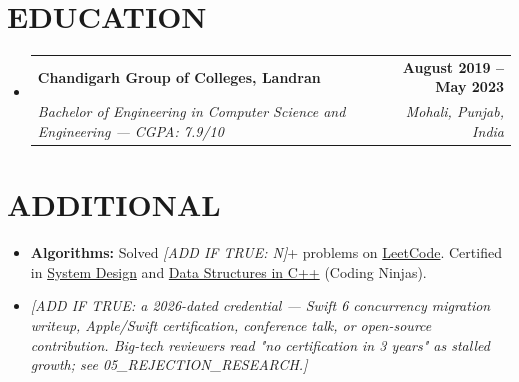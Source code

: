 \documentclass[letterpaper,11pt]{article}
\makeatletter
\newcommand{\resumeItem}[1]{\item\small{{#1 \vspace{-2pt}}}}
\newcommand{\resumeSubheading}[4]{
  \vspace{-2pt}\item
    \begin{tabular*}{1.0\textwidth}[t]{l@{\extracolsep{\fill}}r}
      \textbf{\large#1} & \textbf{\small #2} \\
      \textit{\small#3} & \textit{\small #4} \\
    \end{tabular*}\vspace{-7pt}
}
\newcommand{\resumeSubHeadingListStart}{\begin{itemize}[leftmargin=0.0in, label={}]}
\newcommand{\resumeSubHeadingListEnd}{\end{itemize}}
\newcommand{\resumeItemListStart}{\begin{itemize}}
\newcommand{\resumeItemListEnd}{\end{itemize}\vspace{-5pt}}
\makeatother
\begin{document}
\vspace{-10pt}

\section{EDUCATION}
  \resumeSubHeadingListStart
    \resumeSubheading
      {Chandigarh Group of Colleges, Landran}{August 2019 -- May 2023}
      {Bachelor of Engineering in Computer Science and Engineering — CGPA: 7.9/10}{Mohali, Punjab, India}
  \resumeSubHeadingListEnd

\vspace{-6pt}

\section{ADDITIONAL}
    \vspace{2pt}
    \resumeItemListStart
        \resumeItem{\textbf{Algorithms:} Solved \textit{[ADD IF TRUE: N]}+ problems on \href{https://leetcode.com/u/sachinkumar6174/}{LeetCode}. Certified in \href{http://ninjasfiles.s3.amazonaws.com/certificate18894980e4209379ac28665887f78da42bac5c2.pdf}{System Design} and \href{https://ninjasfiles.s3.amazonaws.com/certificate19853580c201378561a01f48ae87f59e9220db2.pdf}{Data Structures in C++} (Coding Ninjas).}
        \resumeItem{\textit{[ADD IF TRUE: a 2026-dated credential — Swift 6 concurrency migration writeup, Apple/Swift certification, conference talk, or open-source contribution. Big-tech reviewers read "no certification in 3 years" as stalled growth; see 05\_REJECTION\_RESEARCH.]}}
    \resumeItemListEnd
\end{document}
